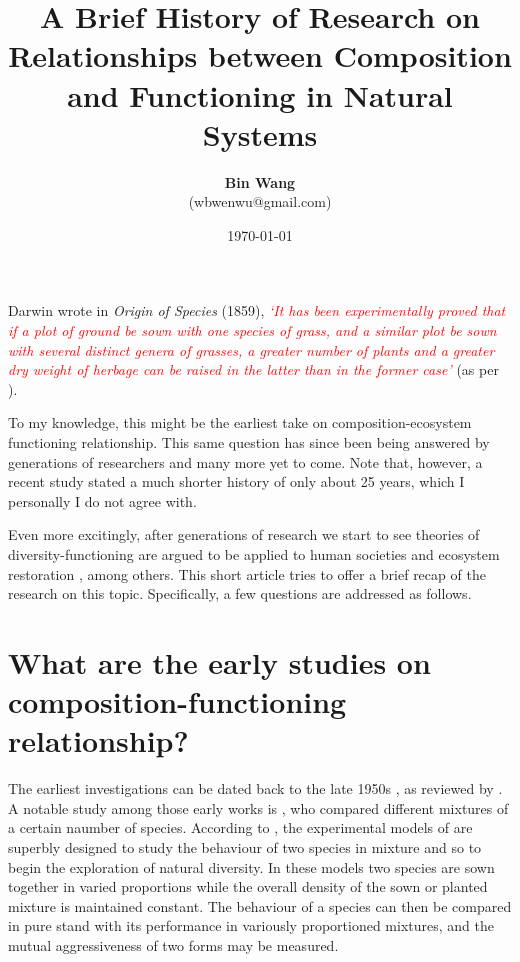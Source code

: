 \documentclass[letterpaper, 10pt]{article}
\begin{document}
\setlength{\droptitle}{-10em} 
\title{\textbf{A Brief History of Research on Relationships between Composition and
Functioning in Natural Systems}\vspace{-0em}}
\author{\textbf{Bin Wang}\\(wbwenwu@gmail.com)\vspace{0em}}
\date{\today\vspace{1em}}
\maketitle

Darwin wrote in \textit{Origin of Species} (1859), \textcolor{red}{\textit{`It has been experimentally proved that if a plot of ground be sown with one species of grass, and a similar plot be sown with several distinct genera of grasses, a greater number of plants and a greater dry weight of herbage can be raised in the latter than in the former case'}} (as per \citep{harperdarwinian}). 

To my knowledge, this might be the earliest take on composition-ecosystem functioning relationship. This same question has since been being answered by generations of researchers and many more yet to come. Note that, however, a recent study stated a much shorter history of only about 25 years\citep{jochum2020results}, which I personally I do not agree with.

Even more excitingly, after generations of research we start to see theories of diversity-functioning are argued to be applied to human societies\citep{dunn2019biodiversity} and ecosystem restoration \citep{zhang2020improve}, among others. This short article tries to offer a brief recap of the research on this topic. Specifically, a few questions are addressed as follows.

\section{What are the early studies on composition-functioning relationship?}
The earliest investigations can be dated back to the late 1950s \citep{de1960competitionthesis, de1960competition}, as reviewed by \citep{harperdarwinian}. A notable study among those early works is \citep{de1960competition}, who compared different mixtures of a certain naumber of species. According to \citep{harperdarwinian}, the experimental models of \citep{de1960competition} are superbly designed to study the behaviour of two species in mixture and so to begin the exploration of natural diversity. In these models two species are sown together in varied proportions while the overall density of the sown or planted mixture is maintained constant. The behaviour of a species can then be compared in pure stand with its performance in variously proportioned mixtures, and the mutual aggressiveness of two forms may be measured.
\end{document}
